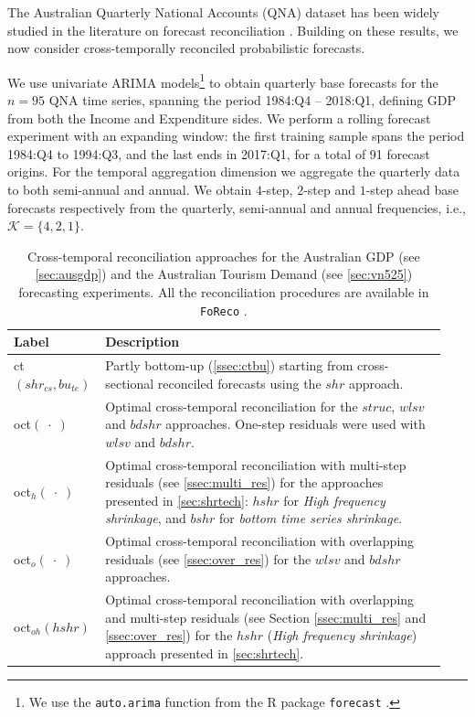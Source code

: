 \documentclass[review, 11pt]{elsarticle}
\theoremstyle{definition}
\begin{document}
The Australian Quarterly National Accounts (QNA) dataset has been widely studied in the literature on forecast reconciliation \citep{athanasopoulos2020, difonzo2023}. Building on these results, we now consider cross-temporally reconciled probabilistic forecasts.

We use univariate ARIMA models\footnote{We use the \texttt{auto.arima} function from the R package \texttt{forecast} \citep{Rforecast}.} to obtain quarterly base forecasts for the $n = 95$ QNA time series, spanning the period 1984:Q4 -- 2018:Q1, defining GDP from both the Income and Expenditure sides. We perform a rolling forecast experiment with an expanding window: the first training sample spans the period 1984:Q4 to 1994:Q3, and the last ends in 2017:Q1, for a total of 91 forecast origins. For the temporal aggregation dimension we aggregate the quarterly data to both semi-annual and annual. We obtain $4$-step, $2$-step and $1$-step ahead base forecasts respectively from the quarterly, semi-annual and annual frequencies, i.e., $\mathcal{K} = \{4,2,1\}$.


\begin{table}[!t]
	\centering
	\begin{tabular}{M{0.17\linewidth}|L{0.77\linewidth}}
		\toprule
		\textbf{Label} & \textbf{Description} \\
		\midrule
		ct$(shr_{cs}, bu_{te})$ & Partly bottom-up (\autoref{ssec:ctbu}) starting from cross-sectional reconciled forecasts using the $shr$ approach.\\
		\addlinespace[0.15cm]
		oct$(\;\cdot\;)$ & Optimal cross-temporal reconciliation for the $struc$, $wlsv$ and $bdshr$ approaches. One-step residuals were used with $wlsv$ and $bdshr$. \\
		\addlinespace[0.15cm]
		oct$_h(\;\cdot\;)$ & Optimal cross-temporal reconciliation with multi-step residuals (see \autoref{ssec:multi_res}) for the approaches presented in \autoref{sec:shrtech}: $hshr$ for \textit{High frequency shrinkage}, and $bshr$ for \textit{bottom time series shrinkage}.\\
		\addlinespace[0.15cm]
		oct$_o(\;\cdot\;)$ & Optimal cross-temporal reconciliation with overlapping residuals (see \autoref{ssec:over_res}) for the $wlsv$ and $bdshr$ approaches. \\
		\addlinespace[0.15cm]
		oct$_{oh}(hshr)$ & Optimal cross-temporal reconciliation with overlapping and multi-step residuals (see Section \ref{ssec:multi_res} and \ref{ssec:over_res}) for the $hshr$ (\textit{High frequency shrinkage}) approach presented in \autoref{sec:shrtech}.\\
		\bottomrule
	\end{tabular}%
	\caption{Cross-temporal reconciliation approaches for %
	the Australian GDP (see \autoref{sec:ausgdp}) and the Australian Tourism Demand (see \autoref{sec:vn525}) forecasting experiments. All the reconciliation procedures are available in \texttt{FoReco} \citep{foreco2023}.}
	\label{tab:notation}
	\vspace*{-0.5\baselineskip}
\end{table}
\end{document}
